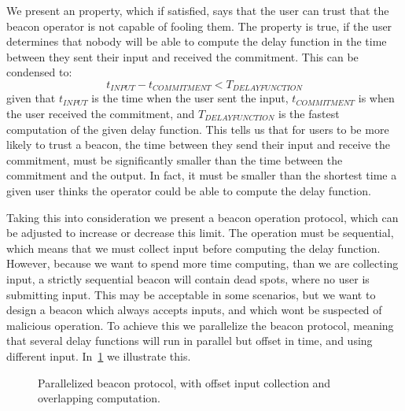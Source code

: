 We present an property, which if satisfied, says that the user can trust that the beacon operator is not capable of fooling them.
The property is true, if the user determines that nobody will be able to compute the delay function in the time between they sent their input and received the commitment.
This can be condensed to:
\begin{equation}
    t_{INPUT} - t_{COMMITMENT} < T_{DELAY FUNCTION}
\end{equation}
given that $t_{INPUT}$ is the time when the user sent the input, $t_{COMMITMENT}$ is when the user received the commitment, and $T_{DELAY FUNCTION}$ is the fastest computation of the given delay function.
This tells us that for users to be more likely to trust a beacon, the time between they send their input and receive the commitment, must be significantly smaller than the time between the commitment and the output.
In fact, it must be smaller than the shortest time a given user thinks the operator could be able to compute the delay function.

Taking this into consideration we present a beacon operation protocol, which can be adjusted to increase or decrease this limit.
The operation must be sequential, which means that we must collect input before computing the delay function.
However, because we want to spend more time computing, than we are collecting input, a strictly sequential beacon will contain dead spots, where no user is submitting input.
This may be acceptable in some scenarios, but we want to design a beacon which always accepts inputs, and which wont be suspected of malicious operation.
To achieve this we parallelize the beacon protocol, meaning that several delay functions will run in parallel but offset in time, and using different input.
In~\cref{fig:beacon_parallel_timeline} we illustrate this.

\begin{figure}
    \centering
    \footnotesize
    \caption{Parallelized beacon protocol, with offset input collection and overlapping computation.}\label{fig:beacon_parallel_timeline}
\end{figure}

